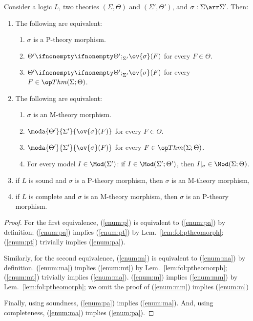 \begin{theorem}\label{thm:fol:theomorph}
Consider a logic $L$, two theories $(\Sigma,\Theta)$ and $(\Sigma',\Theta')$, and $\sigma:\Sigma\arr\Sigma'$. Then:
\begin{enumerate}
	\item The following are equivalent:
	\begin{enumerate}
		 \item\label{enum:p} $\sigma$ is a P-theory morphism.
		 \item\label{enum:pa} $\iscons{\Sigma'}{\Theta'}{}{\ov{\sigma}(F)}$ for every $F\in\Theta$.
		 \item\label{enum:pt} $\iscons{\Sigma'}{\Theta'}{}{\ov{\sigma}(F)}$ for every $F\in\Thm(\Sigma;\Theta)$.
	\end{enumerate}
	\item The following are equivalent:
	\begin{enumerate}
		 \item\label{enum:m} $\sigma$ is an M-theory morphism.
		 \item\label{enum:ma} $\moda{\Theta'}{\Sigma'}{\ov{\sigma}(F)}$ for every $F\in\Theta$.
		 \item\label{enum:mt} $\moda{\Theta'}{\Sigma'}{\ov{\sigma}(F)}$ for every $F\in\Thm(\Sigma;\Theta)$.
		 \item\label{enum:mm} For every model $I\in\Mod(\Sigma')$: if $I\in\Mod(\Sigma';\Theta')$, then $\reduce{\sigma}{I}\in\Mod(\Sigma;\Theta)$.
	\end{enumerate}
	\item\label{enum:p-m} if $L$ is sound and $\sigma$ is a P-theory morphism, then $\sigma$ is an M-theory morphism,
	\item\label{enum:m-p} if $L$ is complete and $\sigma$ is an M-theory morphism, then $\sigma$ is an P-theory morphism.
\end{enumerate}
\end{theorem}
\begin{proof}
For the first equivalence, (\ref{enum:p}) is equivalent to (\ref{enum:pa}) by definition; (\ref{enum:pa}) implies (\ref{enum:pt}) by Lem.~\ref{lem:fol:ptheomorph}; (\ref{enum:pt}) trivially implies (\ref{enum:pa}).

Similarly, for the second equivalence, (\ref{enum:m}) is equivalent to (\ref{enum:ma}) by definition. (\ref{enum:ma}) implies (\ref{enum:mt}) by Lem.~\ref{lem:fol:ptheomorph}; (\ref{enum:mt}) trivially implies (\ref{enum:ma}). (\ref{enum:m}) implies (\ref{enum:mm}) by Lem.~\ref{lem:fol:ptheomorph}; we omit the proof of (\ref{enum:mm}) implies (\ref{enum:m})

Finally, using soundness, (\ref{enum:pa}) implies (\ref{enum:ma}). And, using completeness, (\ref{enum:ma}) implies (\ref{enum:pa}).
\end{proof}

